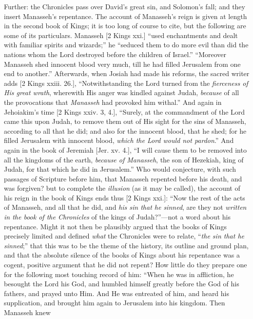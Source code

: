 Further: the Chronicles pass over David's great sin, and Solomon's
fall; and they insert Manasseh's repentance. The account of Manasseh's
reign is given at length in the second book of Kings; it is too long
of course to cite, but the following are some of its particulars.
Manasseh [2 Kings xxi.] ``used enchantments and dealt with
familiar spirits and wizards;'' he ``seduced them to do more
evil than did the nations whom the Lord destroyed before the children
of Israel.'' ``Moreover Manasseh shed innocent blood very
much, till he had filled Jerusalem from one end to another.''
Afterwards, when Josiah had made his reforms, the sacred writer adds
[2 Kings xxiii. 26.], ``Notwithstanding the Lord turned from the \emph{fierceness
of His great wrath}, wherewith His anger was kindled against Judah,
\emph{because} of all the provocations that \emph{Manasseh} had
provoked him withal.'' And again in Jehoiakim's time [2 Kings xxiv.
3, 4.], ``Surely, at the commandment of the Lord came this upon
Judah, to remove them out of His sight for the sins of Manasseh,
according to all that he did; and also for the innocent blood, that he
shed; for he filled Jerusalem with innocent blood, \emph{which the Lord
would not pardon}.'' And again in the book of Jeremiah [Jer.
xv. 4.], ``I will cause them to be removed into all the kingdoms
of the earth, \emph{because of Manasseh}, the son of Hezekiah, king of
Judah, for that which he did in Jerusalem.'' Who would conjecture,
with such passages of Scripture before him, that Manasseh repented
before his death, and was forgiven? but to complete the \emph{illusion}
(as it may be called), the account of his reign in the book of
Kings ends thus [2 Kings xxi.]: ``Now the rest of the acts of
Manasseh, and all that he did, and \emph{his sin that he sinned}, are
they not \emph{written in the book of the Chronicles} of the kings of
Judah?''—not a word about his repentance. Might it not then be
plausibly argued that the books of Kings precisely limited and defined
\emph{what} the Chronicles were to relate, ``\emph{the sin that he sinned};''
that this was to be the theme of the history, its outline and ground
plan, and that the absolute silence of the books of Kings about his
repentance was a cogent, positive argument that he did not repent? How
little do they prepare one for the following most touching record of
him: ``When he was in affliction, he besought the Lord his God,
and humbled himself greatly before the God of his fathers, and prayed
unto Him. And He was entreated of him, and heard his supplication, and
brought him again to Jerusalem into his kingdom. Then Manasseh knew
